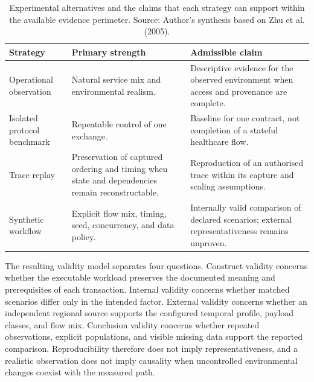 \begingroup
\renewcommand{\arraystretch}{1.0}
\begin{table}[H]
    \centering
    \caption[Experimental alternatives and admissible claims]{Experimental
    alternatives and the claims that each strategy can
    support within the available evidence perimeter. Source: Author's synthesis based on
    Zhu et al. (2005).}
    \label{tab:solution-alternatives}
    \small
    \begin{tabular}{|>{\raggedright\arraybackslash}p{2.8cm}|>{\raggedright\arraybackslash}p{4.2cm}|>{\raggedright\arraybackslash}p{4.6cm}|}
    \hline
    \rowcolor{veryPeri!18}
    \textbf{Strategy} & \textbf{Primary strength} & \textbf{Admissible claim} \\
    \hline
    \rowcolor{tableGray}
    Operational observation & Natural service mix and environmental realism. & Descriptive evidence for the observed environment when access and provenance are complete. \\
    \hline
    Isolated protocol benchmark & Repeatable control of one exchange. & Baseline for one contract, not completion of a stateful healthcare flow. \\
    \hline
    \rowcolor{tableGray}
    Trace replay & Preservation of captured ordering and timing when state and dependencies remain reconstructable. & Reproduction of an authorised trace within its capture and scaling assumptions. \\
    \hline
    Synthetic workflow & Explicit flow mix, timing, seed, concurrency, and data policy. & Internally valid comparison of declared scenarios; external representativeness remains unproven. \\
    \hline
\end{tabular}
\end{table}
\endgroup

\noindent The resulting validity model separates four questions. Construct
validity concerns whether the executable workload preserves the documented
meaning and prerequisites of each transaction. Internal validity concerns whether
matched scenarios differ only in the intended factor. External validity concerns
whether an independent regional source supports the configured temporal profile,
payload classes, and flow mix. Conclusion validity concerns whether repeated
observations, explicit populations, and visible missing data support the reported
comparison. Reproducibility therefore does not imply representativeness, and a
realistic observation does not imply causality when uncontrolled environmental
changes coexist with the measured path.

